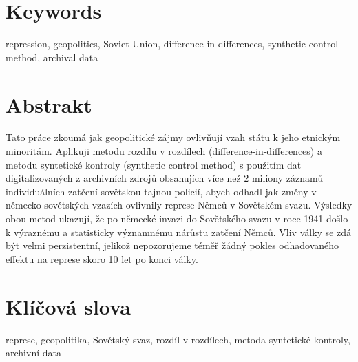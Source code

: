 \section*{Keywords}
repression, geopolitics, Soviet Union, difference-in-differences, synthetic control method,  archival data \\
\newpage
\section*{Abstrakt}
Tato práce zkoumá jak geopolitické zájmy ovlivňují vzah státu k jeho etnickým minoritám. 
Aplikuji metodu rozdílu v rozdílech (difference-in-differences) a metodu syntetické kontroly (synthetic control method) s použitím  dat digitalizovaných z archivních zdrojů obsahujích více než 2 miliony záznamů individuálních zatčení sovětskou tajnou policií, abych odhadl jak změny v německo-sovětských vzazích ovlivnily represe Němců v Sovětském svazu.  
Výsledky obou metod ukazují, že po německé invazi do Sovětského svazu v roce 1941 došlo k výraznému a statisticky významnému nárůstu zatčení Němců. 
Vliv války  se zdá být velmi perzistentní, jelikož nepozorujeme téměř  žádný pokles odhadovaného effektu na represe skoro 10 let po konci války.%

\section*{Klíčová slova}
represe, geopolitika, Sovětský svaz, rozdíl v rozdílech, metoda syntetické kontroly, archivní data\\

\newpage
